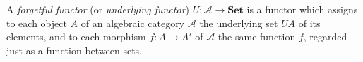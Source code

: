 A \emph{forgetful functor} (or \emph{underlying functor}) $U: \mathcal{A} \rightarrow \mathbf{Set}$ is a functor which assigns to each object $A$ of an algebraic category $\mathcal{A}$ the underlying set $UA$ of its elements, and to each morphism $f: A \rightarrow A'$ of $\mathcal{A}$ the same function $f$, regarded just as a function between sets.
